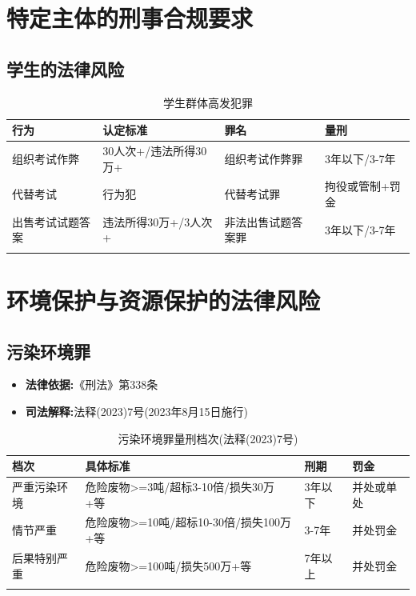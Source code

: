 \documentclass[12pt,a4paper]{article}
\begin{document}
\clearpage

\section{特定主体的刑事合规要求}

\subsection{学生的法律风险}

\begin{longtable}{p{3cm}p{4cm}p{3cm}p{3cm}}
  \toprule
  \textbf{行为} & \textbf{认定标准} & \textbf{罪名} & \textbf{量刑} \\
  \midrule
  组织考试作弊 & 30人次+/违法所得30万+ & 组织考试作弊罪 & 3年以下/3-7年 \\
  代替考试 & 行为犯 & 代替考试罪 & 拘役或管制+罚金 \\
  出售考试试题答案 & 违法所得30万+/3人次+ & 非法出售试题答案罪 & 3年以下/3-7年 \\
  \bottomrule
  \caption{学生群体高发犯罪}
\end{longtable}

\clearpage

\section{环境保护与资源保护的法律风险}

\subsection{污染环境罪}

\begin{itemize}
  \item \textbf{法律依据:}《刑法》第338条
  \item \textbf{司法解释:}法释(2023)7号(2023年8月15日施行)
\end{itemize}

\begin{longtable}{p{2cm}p{5cm}p{3cm}p{3cm}}
  \toprule
  \textbf{档次} & \textbf{具体标准} & \textbf{刑期} & \textbf{罚金} \\
  \midrule
  严重污染环境 & 危险废物>=3吨/超标3-10倍/损失30万+等 & 3年以下 & 并处或单处 \\
  情节严重 & 危险废物>=10吨/超标10-30倍/损失100万+等 & 3-7年 & 并处罚金 \\
  后果特别严重 & 危险废物>=100吨/损失500万+等 & 7年以上 & 并处罚金 \\
  \bottomrule
  \caption{污染环境罪量刑档次(法释(2023)7号)}
\end{longtable}
\end{document}
